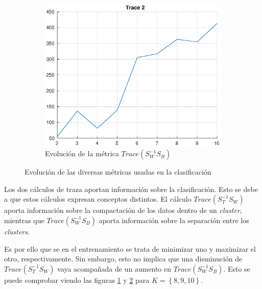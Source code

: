 \documentclass[11pt]{article} %
\begin{document}
\begin{figure}
\begin{subfigure}[b]{0.3\textwidth}
        \label{fig:21:trace:1}
    \end{subfigure}
    \quad
    \begin{subfigure}[b]{0.3\textwidth}
        \includegraphics[width=\textwidth]{../src/fig/21_trace2.eps}
        \caption[]{Evolución de la métrica $Trace \left( S_W^{-1} S_B \right)$}
        \label{fig:21:trace:2}
    \end{subfigure}
    \caption{Evolución de las diversas métricas usadas en la clasificación}
    \label{fig:21:metrics}
\end{figure}

%
%
%
%

Los dos cálculos de traza aportan información sobre la clasificación. Esto se
debe a que estos cálculos expresan conceptos distintos. El cálculo
$Trace \left( S_T^{-1} S_W \right)$ aporta información sobre la compactación de
los datos dentro de un \emph{cluster}, mientras que
$Trace \left( S_W^{-1} S_B \right)$ aporta información sobre la separación entre
los \emph{clusters}.

Es por ello que se en el entrenamiento se trata de minimizar uno y maximizar el
otro, respectivamente. Sin embargo, esto no implica que una disminución de
$Trace \left( S_T^{-1} S_W \right)$ vaya acompañada de un aumento en
$Trace \left( S_W^{-1} S_B \right)$. Esto se puede comprobar viendo las figuras
\ref{fig:21:trace:1} y \ref{fig:21:trace:2} para
$K= \left\lbrace 8, 9, 10 \right\rbrace $.
\end{document}
